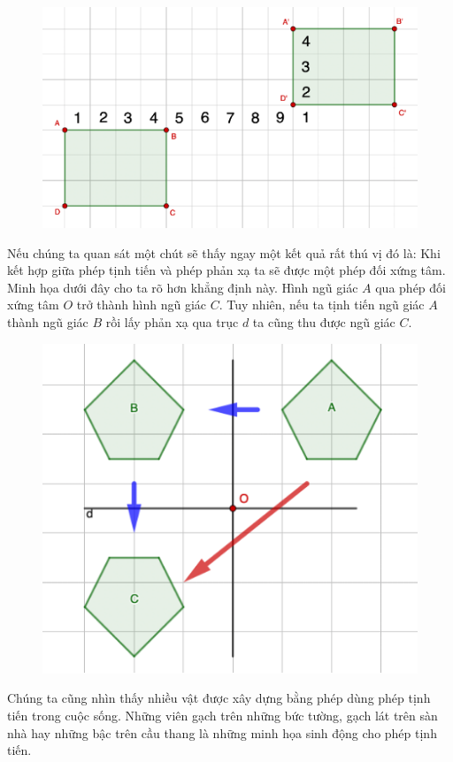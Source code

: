 \begin{multicols}{2}
	\begin{figure}[H]
		\vspace*{-5pt}
		\centering
		\captionsetup{labelformat= empty, justification=centering}
		\includegraphics[width= 1\linewidth]{Picture32}
		\vspace*{-15pt}
	\end{figure}
	Nếu chúng ta quan sát một chút sẽ thấy ngay một kết quả rất thú vị đó là: Khi kết hợp giữa phép tịnh tiến và phép phản xạ ta sẽ được một phép đối xứng tâm. Minh họa dưới đây cho ta rõ hơn khẳng định này.
	Hình ngũ giác $A$ qua phép đối xứng tâm $O$ trở thành hình ngũ giác $C$. Tuy nhiên, nếu ta tịnh tiến ngũ giác $A$ thành ngũ giác $B$ rồi lấy phản xạ qua trục $d$ ta cũng thu được ngũ giác $C$.
	\begin{figure}[H]
		\vspace*{-5pt}
		\centering
		\captionsetup{labelformat= empty, justification=centering}
		\includegraphics[width= 0.5\linewidth]{Picture33}
		\vspace*{-10pt}
	\end{figure}
	Chúng ta cũng nhìn thấy nhiều vật được xây dựng bằng phép dùng phép tịnh tiến trong cuộc sống. Những viên gạch trên những bức tường, gạch lát trên sàn nhà hay những bậc trên cầu thang là những minh họa sinh động cho phép tịnh tiến.

\end{multicols}

